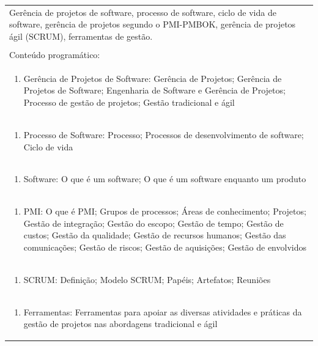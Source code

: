 \documentclass[11pt]{article}
\begin{document}
\begin{center}
\begin{longtable}{|p{4cm}|p{4cm}|p{4cm}|p{4cm}|}
\multicolumn{4}{|p{\dimexpr 16cm + 6\tabcolsep\relax}|}{Gerência de projetos de software, processo de software, ciclo de vida de software, gerência de projetos segundo o PMI-PMBOK, gerência de projetos ágil (SCRUM), ferramentas de gestão.}\\
\multicolumn{4}{|p{16cm}|}{}\\
\hline
\multicolumn{4}{|p{16cm}|}{Conteúdo programático:}\\*
\multicolumn{4}{|p{\dimexpr 16cm + 6\tabcolsep\relax}|}{\begin{enumerate}[start=1]\item Gerência de Projetos de Software: Gerência de Projetos; Gerência de Projetos de Software; Engenharia de Software e Gerência de Projetos; Processo de gestão de projetos; Gestão tradicional e ágil\end{enumerate}}\\
\multicolumn{4}{|p{\dimexpr 16cm + 6\tabcolsep\relax}|}{\begin{enumerate}[start=2]\item Processo de Software: Processo; Processos de desenvolvimento de software; Ciclo de vida\end{enumerate}}\\
\multicolumn{4}{|p{\dimexpr 16cm + 6\tabcolsep\relax}|}{\begin{enumerate}[start=3]\item Software: O que é um software; O que é um software enquanto um produto\end{enumerate}}\\
\multicolumn{4}{|p{\dimexpr 16cm + 6\tabcolsep\relax}|}{\begin{enumerate}[start=4]\item PMI: O que é PMI; Grupos de processos; Áreas de conhecimento; Projetos; Gestão de integração; Gestão do escopo; Gestão de tempo; Gestão de custos; Gestão da qualidade; Gestão de recursos humanos; Gestão das comunicações; Gestão de riscos; Gestão de aquisições; Gestão de envolvidos\end{enumerate}}\\
\multicolumn{4}{|p{\dimexpr 16cm + 6\tabcolsep\relax}|}{\begin{enumerate}[start=5]\item SCRUM: Definição; Modelo SCRUM; Papéis; Artefatos; Reuniões\end{enumerate}}\\
\multicolumn{4}{|p{\dimexpr 16cm + 6\tabcolsep\relax}|}{\begin{enumerate}[start=6]\item Ferramentas: Ferramentas para apoiar as diversas atividades e práticas da gestão de projetos nas abordagens tradicional e ágil\end{enumerate}}\\

\end{longtable}
\end{center}
\end{document}
